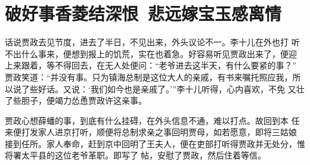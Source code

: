 \chapter{破好事香菱结深恨~悲远嫁宝玉感离情}

话说贾政去见节度，进去了半日，不见出来，外头议论不一。李十儿在外也打
听不出什么事来，便想到报上的饥荒，实在也着急。好容易听见贾政出来了，便迎
上来跟着，等不得回去，在无人处便问：“老爷进去这半天，有什么要紧的事？”
贾政笑道：“并没有事。只为镇海总制是这位大人的亲戚，有书来嘱托照应我，所
以说了些好话。又说：‘我们如今也是亲戚了。’”李十儿听得，心内喜欢，不免
又壮了些胆子，便竭力怂恿贾政许这亲事。

贾政心想薛蟠的事，到底有什么挂碍，在外头信息不通，难以打点。故回到本
任来便打发家人进京打听，顺便将总制求亲之事回明贾母，如若愿意，即将三姑娘
接到任所。家人奉命，赶到京中回明了王夫人，便在吏部打听得贾政并无处分，惟
将署太平县的这位老爷革职。即写了帖，安慰了贾政，然后住着等信。

